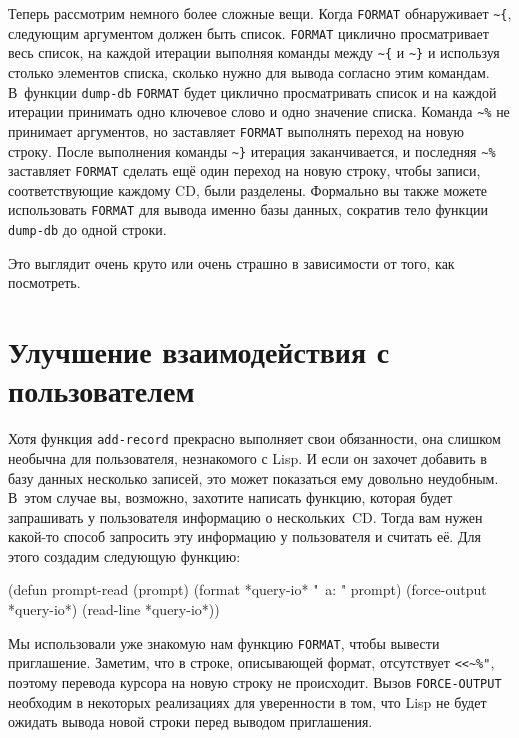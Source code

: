 Теперь рассмотрим немного более сложные вещи. Когда \lstinline{FORMAT} обнаруживает
\lstinline!~{!, следующим аргументом должен быть список. \lstinline{FORMAT} циклично
  просматривает весь список, на каждой итерации выполняя команды между \lstinline!~{! и
    \lstinline!~}! и используя столько элементов списка, сколько нужно для вывода согласно
  этим командам. В~функции \lstinline{dump-db} \lstinline{FORMAT} будет циклично просматривать
  список и на каждой итерации принимать одно ключевое слово и одно значение
  списка. Команда \lstinline!~%! не принимает аргументов, но заставляет \lstinline{FORMAT}
  выполнять переход на новую строку. После выполнения команды \lstinline!~}! итерация
заканчивается, и последняя \lstinline!~%! заставляет \lstinline{FORMAT} сделать ещё один
переход на новую строку, чтобы записи, соответствующие каждому CD, были разделены.
Формально вы также можете использовать \lstinline{FORMAT} для вывода именно базы данных,
сократив тело функции \lstinline{dump-db} до одной строки.


Это выглядит очень круто или очень страшно в зависимости от того, как посмотреть.

\section{Улучшение взаимодействия с пользователем}

Хотя функция \lstinline{add-record} прекрасно выполняет свои обязанности, она слишком необычна
для пользователя, незнакомого с Lisp. И если он захочет добавить в базу данных несколько
записей, это может показаться ему довольно неудобным. В~этом случае вы, возможно, захотите
написать функцию, которая будет запрашивать у пользователя информацию о нескольких~CD.
Тогда вам нужен какой-то способ запросить эту информацию у пользователя и считать её. Для
этого создадим следующую функцию:

\begin{myverb}
(defun prompt-read (prompt)
 (format *query-io* "~a: " prompt)
 (force-output *query-io*)
 (read-line *query-io*))
\end{myverb}

Мы использовали уже знакомую нам функцию \lstinline{FORMAT}, чтобы вывести
приглашение. Заметим, что в строке, описывающей формат, отсутствует \lstinline{<<~%"},
поэтому перевода курсора на новую строку не происходит. Вызов \lstinline{FORCE-OUTPUT}
необходим в некоторых реализациях для уверенности в том, что Lisp не будет ожидать вывода
новой строки перед выводом приглашения.


